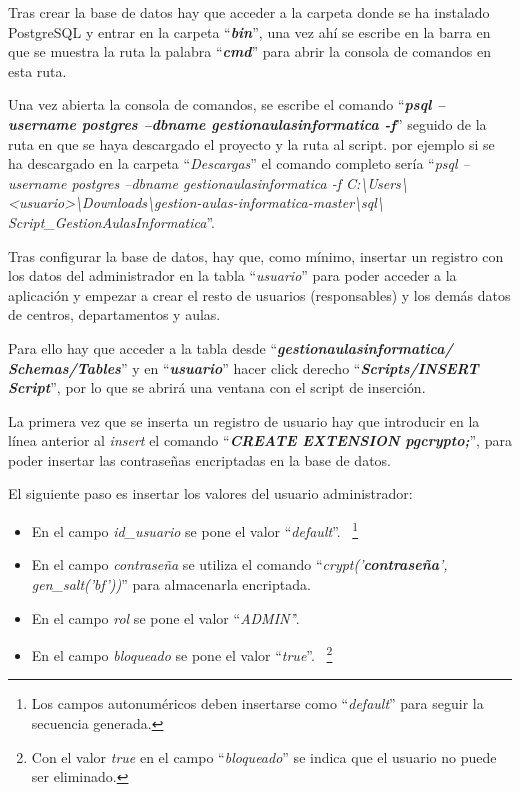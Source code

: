 Tras crear la base de datos hay que acceder a la carpeta donde se ha instalado PostgreSQL y entrar en la carpeta ``\textbf\textit{{bin}}'', una vez ahí se escribe en la barra en que se muestra la ruta la palabra ``\textbf{\textit{cmd}}'' para abrir la consola de comandos en esta ruta.


Una vez abierta la consola de comandos, se escribe el comando ``\textbf{\textit{psql --username postgres --dbname gestionaulasinformatica -f}}'' seguido de la ruta en que se haya descargado el proyecto y la ruta al script. por ejemplo si se ha descargado en la carpeta ``\textit{Descargas}'' el comando completo sería ``\textit{psql --username postgres --dbname gestionaulasinformatica -f C:\textbackslash{}Users\textbackslash{}<usuario>\textbackslash{}Downloads\textbackslash{}gestion-aulas-informatica-master\textbackslash{}sql\textbackslash{} Script\_GestionAulasInformatica}''.

Tras configurar la base de datos, hay que, como mínimo, insertar un registro con los datos del administrador en la tabla ``\textit{usuario}'' para poder acceder a la aplicación y empezar a crear el resto de usuarios (responsables) y los demás datos de centros, departamentos y aulas.

Para ello hay que acceder a la tabla desde ``\textbf{\textit{gestionaulasinformatica/ Schemas/Tables}}'' y en ``\textbf{\textit{usuario}}'' hacer click derecho ``\textbf{\textit{Scripts/INSERT Script}}'', por lo que se abrirá una ventana con el script de inserción.

La primera vez que se inserta un registro de usuario hay que introducir en la línea anterior al \textit{insert} el comando ``\textbf{\textit{CREATE EXTENSION pgcrypto;}}'', para poder insertar las contraseñas encriptadas en la base de datos.

El siguiente paso es insertar los valores del usuario administrador:
\begin{itemize}
    \item En el campo \textit{id\_usuario} se pone el valor ``\textit{default}''. ~\footnote{Los campos autonuméricos deben insertarse como ``\textit{default}'' para seguir la secuencia generada.}
    
    \item En el campo \textit{contraseña} se utiliza el comando ``\textit{crypt('\textbf{contraseña}', gen\_salt('bf'))}'' para almacenarla encriptada.
    
    \item En el campo \textit{rol} se pone el valor ``\textit{ADMIN'}'.
    
    \item En el campo \textit{bloqueado} se pone el valor ``\textit{true}''. ~\footnote{Con el valor \textit{true} en el campo ``\textit{bloqueado}'' se indica que el usuario no puede ser eliminado.}
\end{itemize}

